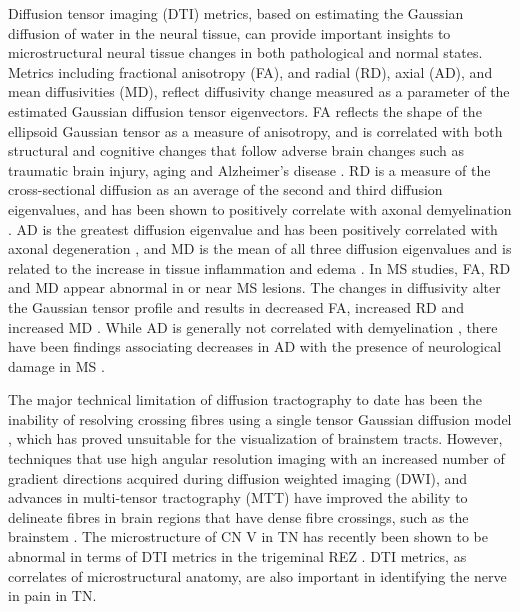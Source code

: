 Diffusion tensor imaging (DTI) metrics, based on estimating the Gaussian diffusion of water in the neural tissue, can provide important insights to microstructural neural tissue changes in both pathological and normal states. Metrics including fractional anisotropy (FA), and radial (RD), axial (AD), and mean diffusivities (MD), reflect diffusivity change measured as a parameter of the estimated Gaussian diffusion tensor eigenvectors.  FA reflects the shape of the ellipsoid Gaussian tensor as a measure of anisotropy, and is correlated with both structural and cognitive changes that follow adverse brain changes such as traumatic brain injury, aging and Alzheimer’s disease \cite{Bendlin2008,Charlton2006,Kinnunen2011c,Mielke2012}. RD is a measure of the cross-sectional diffusion as an average of the second and third diffusion eigenvalues, and has been shown to positively correlate with axonal demyelination \cite{Song2002,Song2005}. AD is the greatest diffusion eigenvalue and has been positively correlated with axonal degeneration \cite{Budde2009,Song2002}, and MD is the mean of all three diffusion eigenvalues and is related to the increase in tissue inflammation and edema \cite{Beaulieu2002}. In MS studies, FA, RD and MD appear abnormal in or near MS lesions. The changes in diffusivity alter the Gaussian tensor profile and results in decreased FA, increased RD and increased MD \cite{Braley2012,Janve2013,Klawiter2011,Lin2007,Senda2012g}. While AD is generally not correlated with demyelination \cite{Song2002}, there have been findings associating decreases in AD with the presence of neurological damage in MS \cite{Budde2008,Kim2006}. 

The major technical limitation of diffusion tractography to date has been the inability of resolving crossing fibres using a single tensor Gaussian diffusion model \cite{Farquharson2013}, which has proved unsuitable for the visualization of brainstem tracts. However, techniques that use high angular resolution imaging  with an increased number of gradient directions acquired during diffusion weighted imaging (DWI), and advances in multi-tensor tractography (MTT) have improved the ability to delineate fibres in brain regions that have dense fibre crossings, such as the brainstem \cite{DellAcqua2007,Descoteaux2009c,Fillard2011,Qazi2009}. The microstructure of CN V in TN has recently been shown to be abnormal in terms of DTI metrics in the trigeminal REZ \cite{Desouza2013}. DTI metrics, as correlates of microstructural anatomy, are also important in identifying the nerve in pain in TN\cite{Hodaie2009a}. 

